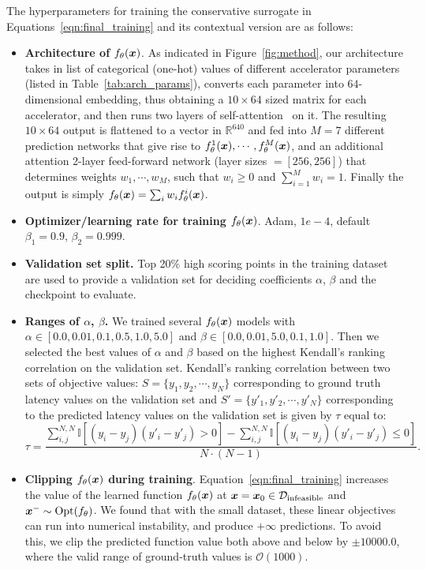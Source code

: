 The hyperparameters for training the conservative surrogate in Equations~\ref{eqn:final_training} and its contextual version are as follows:
\begin{itemize}
    \item \textbf{Architecture of ${f}_\theta({\boldsymbol{x}})$}. As indicated in Figure~\ref{fig:method}, our architecture takes in list of categorical (one-hot) values of different accelerator parameters (listed in Table~\ref{tab:arch_params}), converts each parameter into $64$-dimensional embedding, thus obtaining a $10 \times 64$ sized matrix for each accelerator, and then runs two layers of self-attention~\citep{vaswani2017attention} on it. The resulting $10 \times 64$ output is flattened to a vector in $\mathbb{R}^{640}$ and fed into $M = 7$ different prediction networks that give rise to $f^1_\theta({\boldsymbol{x}}), \cdots, f^M_\theta({\boldsymbol{x}})$, and an additional attention 2-layer feed-forward network (layer sizes $=[256, 256]$) that determines weights $w_1, \cdots, w_M$, such that $w_i \geq 0$ and $\sum_{i=1}^M w_i = 1$. Finally the output is simply $f_\theta({\boldsymbol{x}}) = \sum_i w_i f^i_\theta({\boldsymbol{x}})$. 
    \item \textbf{Optimizer/learning rate for training $f_\theta({\boldsymbol{x}})$}. Adam, $1e-4$, default $\beta_1 = 0.9$, $\beta_2 = 0.999$.
    \item \textbf{Validation set split.} Top 20\% high scoring points in the training dataset are used to provide a validation set for deciding coefficients $\alpha$, $\beta$ and the checkpoint to evaluate.
    \item \textbf{Ranges of $\alpha$, $\beta$.} We trained several $f_\theta({\boldsymbol{x}})$ models with $\alpha \in [0.0, 0.01, 0.1, 0.5, 1.0, 5.0]$ and $\beta \in [0.0, 0.01, 5.0, 0.1, 1.0]$. Then we selected the best values of $\alpha$ and $\beta$ based on the highest Kendall's ranking correlation on the validation set. Kendall's ranking correlation between two sets of objective values: $S = \{y_1, y_2, \cdots, y_N\}$ corresponding to ground truth latency values on the validation set and $S' = \{y'_1, y'_2, \cdots, y'_N \}$ corresponding to the predicted latency values on the validation set is given by $\tau$ equal to:
    \begin{equation}
        \tau = \frac{\sum_{i, j}^{N, N} \mathbb{I}[(y_i - y_j) (y'_i - y'_j) > 0] - \sum_{i, j}^{N, N} \mathbb{I}[(y_i - y_j) (y'_i - y'_j) \leq 0]}{N \cdot (N - 1)}.   
    \end{equation}
    \item \textbf{Clipping $f_\theta({\boldsymbol{x}})$ during training}. Equation~\ref{eqn:final_training} increases the value of the learned function $f_\theta({\boldsymbol{x}})$ at ${\boldsymbol{x}} = {\boldsymbol{x}}_0 \in \mathcal{D}_\text{infeasible}$ and ${\boldsymbol{x}}^- \sim \mathrm{Opt}(f_\theta)$. We found that with the small dataset, these linear objectives can run into numerical instability, and produce $+\infty$ predictions. To avoid this, we clip the predicted function value both above and below by $\pm 10000.0$, where the valid range of ground-truth values is $\mathcal{O}(1000)$.

\end{itemize}
